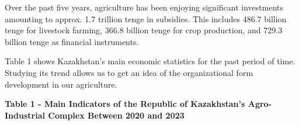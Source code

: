 Over the past five years, agriculture has been enjoying significant
investments amounting to approx. 1.7 trillion tenge in subsidies. This
includes 486.7 billion tenge for livestock farming, 366.8 billion tenge
for crop production, and 729.3 billion tenge as financial instruments.

Table 1 shows Kazakhstan's main economic statistics for the past period
of time. Studying its trend allows us to get an idea of the
organizational form development in our agriculture.

{\bfseries Table 1 - Main Indicators of the Republic of Kazakhstan's
Agro-Industrial Complex Between 2020 and 2023}

